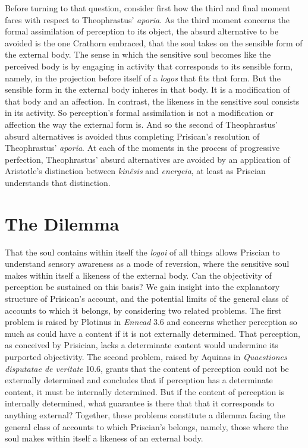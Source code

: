 \documentclass[12pt]{article}
\begin{document}
Before turning to that question, consider first how the third and final moment fares with respect to Theophrastus' \emph{aporia}. As the third moment concerns the formal assimilation of perception to its object, the absurd alternative to be avoided is the one Crathorn embraced, that the soul takes on the sensible form of the external body. The sense in which the sensitive soul becomes like the perceived body is by engaging in activity that corresponds to its sensible form, namely, in the projection before itself of a \emph{logos} that fits that form. But the sensible form in the external body inheres in that body. It is a modification of that body and an affection. In contrast, the likeness in the sensitive soul consists in its activity. So perception's formal assimilation is not a modification or affection the way the external form is. And so the second of Theophrastus' absurd alternatives is avoided thus completing Prisican's resolution of Theophrastus' \emph{aporia}. At each of the moments in the process of progressive perfection, Theophrastus' absurd alternatives are avoided by an application of Aristotle’s distinction between \emph{kinêsis} and \emph{energeia}, at least as Priscian understands that distinction.



\section{The Dilemma} %
\label{sec:some_related_problems_ldots}

That the soul contains within itself the \emph{logoi} of all things allows Priscian to understand sensory awareness as a mode of reversion, where the sensitive soul makes within itself a likeness of the external body. Can the objectivity of perception be sustained on this basis? We gain insight into the explanatory structure of Prisican's account, and the potential limits of the general class of accounts to which it belongs, by considering two related problems. The first problem is raised by Plotinus in \emph{Ennead} 3.6 and concerns whether perception so much as could have a content if it is not externally determined. That perception, as conceived by Prisician, lacks a determinate content would undermine its purported objectivity. The second problem, raised by Aquinas in \emph{Quaestiones disputatae de veritate} 10.6, grants that the content of perception could not be externally determined and concludes that if perception has a determinate content, it must be internally determined. But if the content of perception is internally determined, what guarantee is there that that it corresponds to anything external? Together, these problems constitute a dilemma facing the general class of accounts to which Priscian's belongs, namely, those where the soul makes within itself a likeness of an external body.
\end{document}
